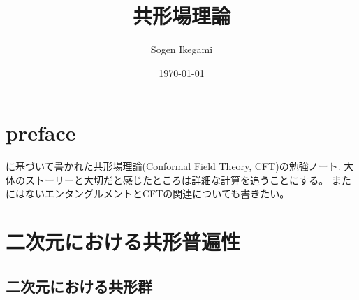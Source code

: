\documentclass[11pt, aps, longbibliography]{article}
\numberwithin{equation}{section}
\begin{document}
\title{共形場理論}
\author{Sogen Ikegami}
\date{\today}
\maketitle

\tableofcontents

\section*{preface}
\cite{yellow}に基づいて書かれた共形場理論(Conformal Field Theory, CFT)の勉強ノート.
大体のストーリーと大切だと感じたところは詳細な計算を追うことにする。
また\cite{yellow}にはないエンタングルメントとCFTの関連についても書きたい。

\newpage

\section{二次元における共形普遍性}

\subsection{二次元における共形群}
\end{document}
